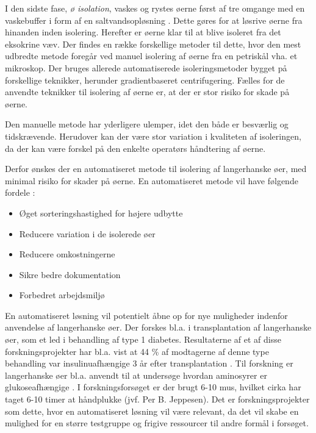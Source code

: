 I den sidste fase, \textit{ø isolation}, vaskes og rystes øerne først af tre omgange med en vaskebuffer i form af en saltvandsopløsning \citep{hbbs}. Dette gøres for at løsrive øerne fra hinanden inden isolering. Herefter er øerne klar til at blive isoleret fra det eksokrine væv. Der findes en række forskellige metoder til dette, hvor den mest udbredte metode foregår ved manuel isolering af øerne fra en petriskål vha. et mikroskop. Der bruges allerede automatiserede isoleringsmetoder bygget på forskellige teknikker, herunder gradientbaseret centrifugering. Fælles for de anvendte teknikker til isolering af øerne er, at der er stor risiko for skade på øerne. 

Den manuelle metode har yderligere ulemper, idet den både er besværlig og tidskrævende. Herudover kan der være stor variation i kvaliteten af isoleringen, da der kan være forskel på den enkelte operatørs håndtering af øerne. 

Derfor ønskes der en automatiseret metode til isolering af langerhanske øer, med minimal risiko for skader på øerne. En automatiseret metode vil have følgende fordele \cite{pptintro}: 

\begin{itemize}
\item Øget sorteringshastighed for højere udbytte
\item Reducere variation i de isolerede øer
\item Reducere omkostningerne
\item Sikre bedre dokumentation
\item Forbedret arbejdsmiljø
\end{itemize} 

En automatiseret løsning vil potentielt åbne op for nye muligheder indenfor anvendelse af langerhanske øer. Der forskes bl.a. i transplantation af langerhanske øer, som et led i behandling af type 1 diabetes. Resultaterne af et af disse forskningsprojekter har bl.a. vist at 44 \% af modtagerne af denne type behandling var insulinuafhængige 3 år efter transplantation \citep{islettransplantation}. Til forskning er langerhanske øer bl.a. anvendt til at undersøge hvordan aminosyrer er glukoseafhængige \citep{aminosyre}. I forskningsforsøget er der brugt 6-10 mus, hvilket cirka har taget 6-10 timer at håndplukke (jvf. Per B. Jeppesen). Det er forskningsprojekter som dette, hvor en automatiseret løsning vil være relevant, da det vil skabe en mulighed for en større testgruppe og frigive ressourcer til andre formål i forsøget.

